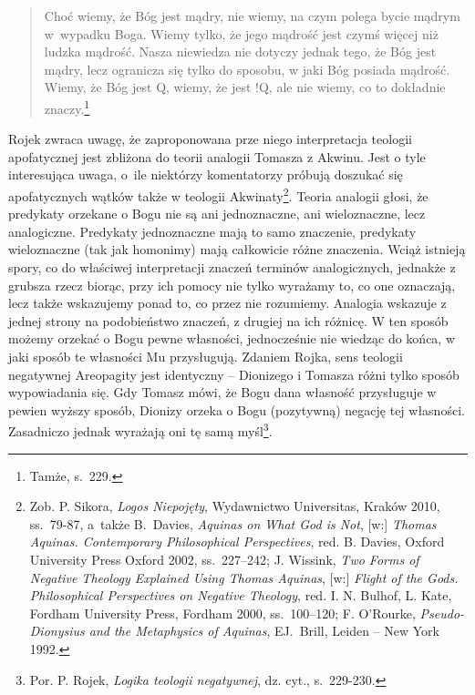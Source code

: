 \begin{quote}
    Choć wiemy, że Bóg jest mądry, nie wiemy, na czym polega bycie mądrym
    w~wypadku Boga. Wiemy tylko, że jego mądrość jest czymś więcej niż ludzka
mądrość. Nasza niewiedza nie dotyczy jednak tego, że Bóg jest mądry,
lecz ogranicza się tylko do sposobu, w jaki Bóg posiada mądrość. Wiemy,
że Bóg jest Q, wiemy, że jest !Q, ale nie wiemy, co to dokładnie
znaczy.\footnote{Tamże, s.~229. }
\end{quote}





Rojek zwraca uwagę, że zaproponowana prze niego interpretacja teologii
apofatycznej jest zbliżona do 
teorii analogii Tomasza z Akwinu. Jest o tyle interesująca uwaga, o~ile niektórzy
komentatorzy próbują doszukać się apofatycznych wątków także w teologii
Akwinaty\footnote{Zob. P. Sikora, \textit{Logos Niepojęty}, Wydawnictwo Universitas, Kraków 2010, ss.~79-87,
a~także B.~Davies, \textit{Aquinas on What God is Not}, [w:]  \textit{Thomas
Aquinas. Contemporary Philosophical Perspectives}, red. B. Davies, Oxford University
Press Oxford 2002, ss.~227–242; J. Wissink, \textit{Two Forms of Negative
Theology Explained Using Thomas Aquinas}, [w:]  \textit{Flight of the Gods. Philosophical Perspectives on Negative
Theology}, red. I. N. Bulhof, L.
Kate, Fordham University Press, Fordham 2000, ss.~100--120; F.
O'Rourke, \textit{Pseudo-Dionysius and the Metaphysics of
Aquinas}, EJ.~Brill, Leiden -- New York 1992. }. Teoria analogii
głosi, że predykaty orzekane o Bogu nie są ani jednoznaczne, ani
wieloznaczne, lecz analogiczne. Predykaty jednoznaczne mają to samo
znaczenie, predykaty wieloznaczne (tak jak homonimy) mają całkowicie
różne znaczenia. Wciąż istnieją spory, co do właściwej interpretacji
znaczeń terminów analogicznych, jednakże z grubsza  rzecz biorąc, przy
ich pomocy nie tylko wyrażamy to, co one oznaczają, lecz także
wskazujemy ponad to, co przez nie rozumiemy. Analogia wskazuje z jednej strony
na podobieństwo znaczeń, z drugiej na ich różnicę.
W ten sposób możemy
orzekać o Bogu pewne własności, jednocześnie nie wiedząc do końca, w
jaki sposób te własności Mu przysługują. Zdaniem Rojka, sens teologii
negatywnej Areopagity jest identyczny -- Dionizego i Tomasza różni tylko
sposób wypowiadania się. Gdy Tomasz mówi, że Bogu dana własność
przysługuje w pewien wyższy sposób, Dionizy orzeka o Bogu (pozytywną)
negację tej własności. Zasadniczo jednak wyrażają oni tę samą
myśl\footnote{Por. P. Rojek, \textit{Logika teologii negatywnej}, dz. cyt., s.~229-230.}.



